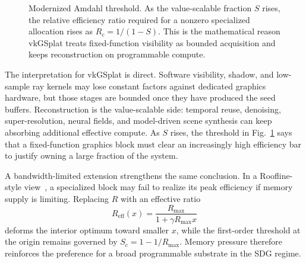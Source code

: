 \documentclass[10pt,journal]{IEEEtran}
\begin{document}
\begin{figure}[t]
\centering
{}
\caption{Modernized Amdahl threshold.  As the value-scalable fraction
$S$ rises, the relative efficiency ratio required for a nonzero
specialized allocation rises as $R_c=1/(1-S)$.  This is the mathematical
reason vkGSplat treats fixed-function visibility as bounded acquisition
and keeps reconstruction on programmable compute.}
\label{fig:appendix-amdahl-threshold}
\end{figure}

The interpretation for vkGSplat is direct.  Software visibility, shadow,
and low-sample ray kernels may lose constant factors against dedicated
graphics hardware, but those stages are bounded once they have produced
the seed buffers.  Reconstruction is the value-scalable side: temporal
reuse, denoising, super-resolution, neural fields, and model-driven scene
synthesis can keep absorbing additional effective compute.  As $S$ rises,
the threshold in Fig.~\ref{fig:appendix-amdahl-threshold} says that a
fixed-function graphics block must clear an increasingly high efficiency
bar to justify owning a large fraction of the system.

A bandwidth-limited extension strengthens the same conclusion.  In a
Roofline-style view~\cite{williams2009}, a specialized block may fail to
realize its peak efficiency if memory supply is limiting.  Replacing $R$
with an effective ratio
\begin{equation}
  R_{\mathrm{eff}}(x) =
  \frac{R_{\max}}{1 + \gamma R_{\max}x}
  \label{eq:appendix-reff}
\end{equation}
deforms the interior optimum toward smaller $x$, while the first-order
threshold at the origin remains governed by $S_c=1-1/R_{\max}$.  Memory
pressure therefore reinforces the preference for a broad programmable
substrate in the SDG regime.
\end{document}
